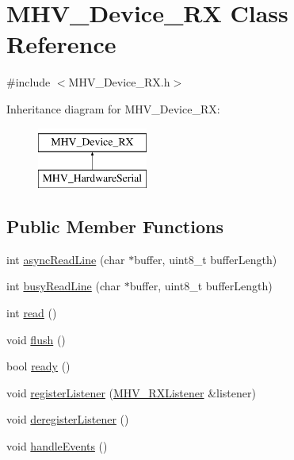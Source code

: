 \hypertarget{class_m_h_v___device___r_x}{
\section{\-M\-H\-V\-\_\-\-Device\-\_\-\-R\-X \-Class \-Reference}
\label{class_m_h_v___device___r_x}
}


{\ttfamily \#include $<$\-M\-H\-V\-\_\-\-Device\-\_\-\-R\-X.\-h$>$}

\-Inheritance diagram for \-M\-H\-V\-\_\-\-Device\-\_\-\-R\-X\-:\begin{figure}[H]
\begin{center}
\leavevmode
\includegraphics[height=2.000000cm]{class_m_h_v___device___r_x}
\end{center}
\end{figure}
\subsection*{\-Public \-Member \-Functions}
\begin{DoxyCompactItemize}
\item 
int \hyperlink{class_m_h_v___device___r_x_ad8da50a37b9f5e84428ce7920f6c7153}{async\-Read\-Line} (char $\ast$buffer, uint8\-\_\-t buffer\-Length)
\item 
int \hyperlink{class_m_h_v___device___r_x_a872dd2a1c97d5e1bb962df0d93c7c3cc}{busy\-Read\-Line} (char $\ast$buffer, uint8\-\_\-t buffer\-Length)
\item 
int \hyperlink{class_m_h_v___device___r_x_ab823ad1f27ec0a659ba3ab896e936b2c}{read} ()
\item 
void \hyperlink{class_m_h_v___device___r_x_a046e51e8d7b47e084fea8f2508e93ae9}{flush} ()
\item 
bool \hyperlink{class_m_h_v___device___r_x_a6d9d253544c30aff62bdcae14f9b2705}{ready} ()
\item 
void \hyperlink{class_m_h_v___device___r_x_a2797697f3b03274f06da79eb5c4e62be}{register\-Listener} (\hyperlink{class_m_h_v___r_x_listener}{\-M\-H\-V\-\_\-\-R\-X\-Listener} \&listener)
\item 
void \hyperlink{class_m_h_v___device___r_x_aeaeee691f88b5895a09afbb1c47d83d1}{deregister\-Listener} ()
\item 
void \hyperlink{class_m_h_v___device___r_x_a13adea72a323b7debc5985e5bba21e58}{handle\-Events} ()
\end{DoxyCompactItemize}
